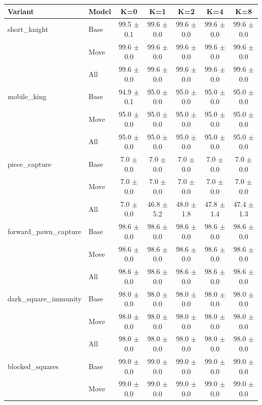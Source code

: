 \begin{table}[t]
\centering
\small
\begin{tabular}{llccccc}
\toprule
Variant & Model & K=0 & K=1 & K=2 & K=4 & K=8 \\
\midrule
short\_knight & Base & 99.5 $\pm$ 0.1 & 99.6 $\pm$ 0.0 & 99.6 $\pm$ 0.0 & 99.6 $\pm$ 0.0 & 99.6 $\pm$ 0.0 \\
 & Move & 99.6 $\pm$ 0.0 & 99.6 $\pm$ 0.0 & 99.6 $\pm$ 0.0 & 99.6 $\pm$ 0.0 & 99.6 $\pm$ 0.0 \\
 & All & 99.6 $\pm$ 0.0 & 99.6 $\pm$ 0.0 & 99.6 $\pm$ 0.0 & 99.6 $\pm$ 0.0 & 99.6 $\pm$ 0.0 \\
\midrule
mobile\_king & Base & 94.9 $\pm$ 0.1 & 95.0 $\pm$ 0.0 & 95.0 $\pm$ 0.0 & 95.0 $\pm$ 0.0 & 95.0 $\pm$ 0.0 \\
 & Move & 95.0 $\pm$ 0.0 & 95.0 $\pm$ 0.0 & 95.0 $\pm$ 0.0 & 95.0 $\pm$ 0.0 & 95.0 $\pm$ 0.0 \\
 & All & 95.0 $\pm$ 0.0 & 95.0 $\pm$ 0.0 & 95.0 $\pm$ 0.0 & 95.0 $\pm$ 0.0 & 95.0 $\pm$ 0.0 \\
\midrule
piece\_capture & Base & 7.0 $\pm$ 0.0 & 7.0 $\pm$ 0.0 & 7.0 $\pm$ 0.0 & 7.0 $\pm$ 0.0 & 7.0 $\pm$ 0.0 \\
 & Move & 7.0 $\pm$ 0.0 & 7.0 $\pm$ 0.0 & 7.0 $\pm$ 0.0 & 7.0 $\pm$ 0.0 & 7.0 $\pm$ 0.0 \\
 & All & 7.0 $\pm$ 0.0 & 46.8 $\pm$ 5.2 & 48.0 $\pm$ 1.8 & 47.8 $\pm$ 1.4 & 47.4 $\pm$ 1.3 \\
\midrule
forward\_pawn\_capture & Base & 98.6 $\pm$ 0.0 & 98.6 $\pm$ 0.0 & 98.6 $\pm$ 0.0 & 98.6 $\pm$ 0.0 & 98.6 $\pm$ 0.0 \\
 & Move & 98.6 $\pm$ 0.0 & 98.6 $\pm$ 0.0 & 98.6 $\pm$ 0.0 & 98.6 $\pm$ 0.0 & 98.6 $\pm$ 0.0 \\
 & All & 98.6 $\pm$ 0.0 & 98.6 $\pm$ 0.0 & 98.6 $\pm$ 0.0 & 98.6 $\pm$ 0.0 & 98.6 $\pm$ 0.0 \\
\midrule
dark\_square\_immunity & Base & 98.0 $\pm$ 0.0 & 98.0 $\pm$ 0.0 & 98.0 $\pm$ 0.0 & 98.0 $\pm$ 0.0 & 98.0 $\pm$ 0.0 \\
 & Move & 98.0 $\pm$ 0.0 & 98.0 $\pm$ 0.0 & 98.0 $\pm$ 0.0 & 98.0 $\pm$ 0.0 & 98.0 $\pm$ 0.0 \\
 & All & 98.0 $\pm$ 0.0 & 98.0 $\pm$ 0.0 & 98.0 $\pm$ 0.0 & 98.0 $\pm$ 0.0 & 98.0 $\pm$ 0.0 \\
\midrule
blocked\_squares & Base & 99.0 $\pm$ 0.0 & 99.0 $\pm$ 0.0 & 99.0 $\pm$ 0.0 & 99.0 $\pm$ 0.0 & 99.0 $\pm$ 0.0 \\
 & Move & 99.0 $\pm$ 0.0 & 99.0 $\pm$ 0.0 & 99.0 $\pm$ 0.0 & 99.0 $\pm$ 0.0 & 99.0 $\pm$ 0.0 \\

\end{tabular}
\end{table}
